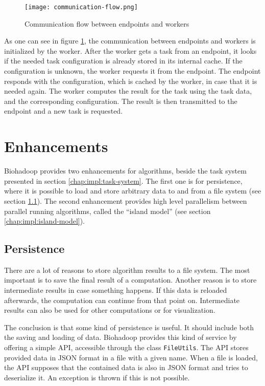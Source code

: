 \begin{figure}[ht!]
  \centering
  \texttt{[image: communication-flow.png]}
  \caption{Communication flow between endpoints and workers}
  \label{fig:communication-flow}
\end{figure}

As one can see in figure \ref{fig:communication-flow}, the communication between endpoints and workers is initialized by the worker. After the worker gets a task from an endpoint, it looks if the needed task configuration is already stored in its internal cache. If the configuration is unknown, the worker requests it from the endpoint. The endpoint responds with the configuration, which is cached by the worker, in case that it is needed again. The worker computes the result for the task using the task data, and the corresponding configuration. The result is then transmitted to the endpoint and a new task is requested.

\section{Enhancements}
\label{chap:impl:enhancements}
Biohadoop provides two enhancements for algorithms, beside the task system presented in section \ref{chap:impl:task-system}. The first one is for persistence, where it is possible to load and store arbitrary data to and from a file system (see section \ref{chap:impl:persistence}). The second enhancement provides high level parallelism between parallel running algorithms, called the ``island model'' (see section \ref{chap:impl:island-model}).

\subsection{Persistence}
\label{chap:impl:persistence}
There are a lot of reasons to store algorithm results to a file system. The most important is to save the final result of a computation. Another reason is to store intermediate results in case something happens. If this data is reloaded afterwards, the computation can continue from that point on. Intermediate results can also be used for other computations or for visualization.

The conclusion is that some kind of persistence is useful. It should include both the saving and loading of data. Biohadoop provides this kind of service by offering a simple API, accessible through the class \texttt{FileUtils}. The API stores provided data in JSON format in a file with a given name. When a file is loaded, the API supposes that the contained data is also in JSON format and tries to deserialize it. An exception is thrown if this is not possible.

